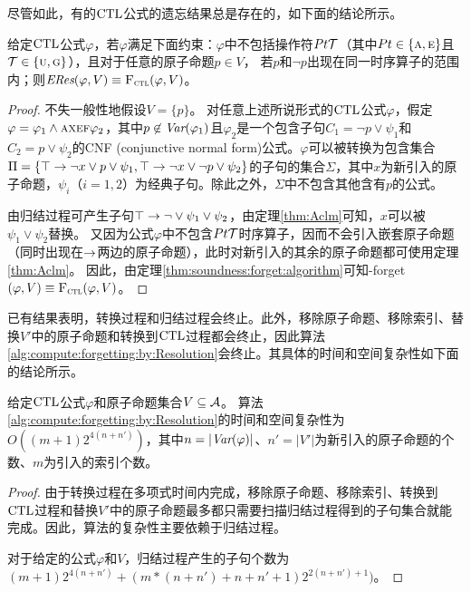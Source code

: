 尽管如此，有的$\textrm{CTL}$公式的遗忘结果总是存在的，如下面的结论所示。
\begin{proposition} \label{pro:fogCTL}
	给定$\textrm{CTL}$公式$\varphi$，若$\varphi$满足下面约束：$\varphi$中不包括操作符$Pt {\cal T}$（其中$Pt \in \{\textsc{a}, \textsc{e}\}$且${\cal T} \in \{\textsc{u}, \textsc{g}\}$），且对于任意的原子命题$p\in V$， 若$p$和$\neg p$出现在同一时序算子的范围内；则$\emph{ERes}(\varphi,V) \equiv {\textsc{F}_{\textsc{ctl}}}(\varphi, V)$。
\end{proposition}
\begin{proof}
	不失一般性地假设$V = \{p\}$。
	对任意上述所说形式的$\textrm{CTL}$公式$\varphi$，假定$\varphi = \varphi_1 \wedge \textsc{a} \textsc{x} \textsc{e} \textsc{f} \varphi_2$，其中$p\not \in \textit{Var}(\varphi_1)$且$\varphi_2$是一个包含子句$C_1 = \neg p \vee \psi_1$和$C_2 = p \vee \psi_2$的CNF (conjunctive normal form)公式。$\varphi$可以被转换为包含集合$\Pi = \{\top \rightarrow \neg x \vee p \vee  \psi_1,  \top \rightarrow \neg x \vee \neg p \vee \psi_2\}$的子句的集合$\Sigma$，其中$x$为新引入的原子命题，$\psi_i$（$i=1,2$）为经典子句。除此之外，$\Sigma$中不包含其他含有$p$的公式。
	
	由归结过程可产生子句$\top \rightarrow \neg \vee \psi_1 \vee \psi_2$，由定理\ref{thm:Aclm}可知，$x$可以被$\psi_1 \vee \psi_2$替换。
	又因为公式$\varphi$中不包含$Pt {\cal T}$时序算子，因而不会引入嵌套原子命题（同时出现在$\rightarrow$两边的原子命题），此时对新引入的其余的原子命题都可使用定理\ref{thm:Aclm}。
	因此，由定理\ref{thm:soundness:forget:algorithm}可知\CTL-forget$(\varphi,V)\equiv {\textsc{F}_{\textsc{ctl}}}(\varphi, V)$。
\end{proof}




\label{chp4:sect:complex}
已有结果表明，转换过程和归结过程会终止\cite{zhang2014resolution}。此外，移除原子命题、移除索引、替换$V'$中的原子命题和转换到$\textrm{CTL}$过程都会终止，因此算法\ref{alg:compute:forgetting:by:Resolution}会终止。其具体的时间和空间复杂性如下面的结论所示。


\begin{proposition}\label{pro:complexity}
	给定$\textrm{CTL}$公式$\varphi$和原子命题集合$V \subseteq {\cal A}$。
	算法\ref{alg:compute:forgetting:by:Resolution}的时间和空间复杂性为$O((m+1)2^{4(n+n')})$，其中$n=|\textit{Var}(\varphi)|$、$n'=|V'|$为新引入的原子命题的个数、$m$为引入的索引个数。
\end{proposition}
\begin{proof}
	由于转换过程在多项式时间内完成，移除原子命题、移除索引、转换到$\textrm{CTL}$过程和替换$V'$中的原子命题最多都只需要扫描归结过程得到的子句集合就能完成。因此，算法的复杂性主要依赖于归结过程。
	
	对于给定的公式$\varphi$和$V$，归结过程产生的子句个数为$(m+1)2^{4(n+n')}+(m*(n+n')+n+n'+1)2^{2(n+n')+1})$。
\end{proof}

